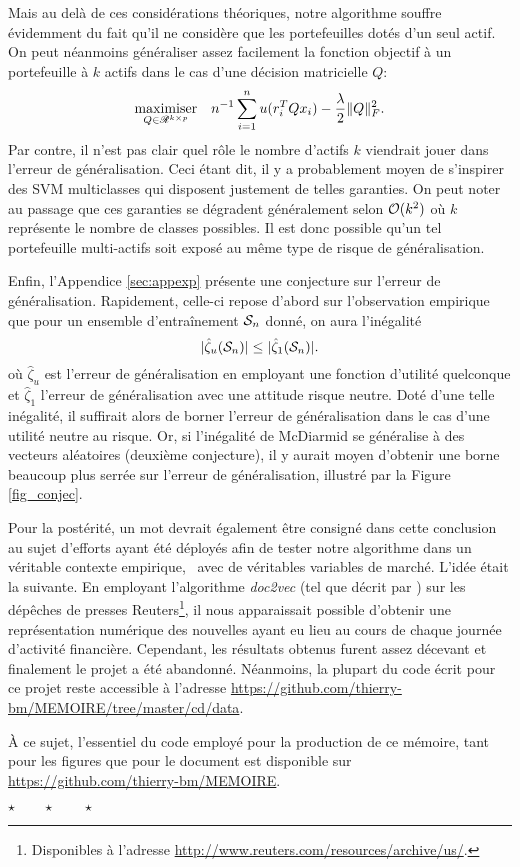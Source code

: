 Mais au delà de ces considérations théoriques, notre algorithme souffre évidemment du fait
qu'il ne considère que les portefeuilles dotés d'un seul actif. On peut néanmoins
généraliser assez facilement la fonction objectif à un portefeuille à $k$ actifs dans le
cas d'une décision matricielle $Q$:
\begin{equation}
  \maximizeEquation[Q \in \Re^{k \times p}]{n^{-1}\sumi u(r_i^TQ x_i) - \frac{\lambda}{2}\|Q\|^2_F.}
\end{equation}
Par contre, il n'est pas clair quel rôle le nombre d'actifs $k$ viendrait jouer dans
l'erreur de généralisation. Ceci étant dit, il y a probablement moyen de s'inspirer des
SVM multiclasses qui disposent justement de telles garanties. On peut noter au passage que
ces garanties se dégradent généralement selon $\bigO(k^2)$ où $k$ représente le nombre de
classes possibles. Il est donc possible qu'un tel portefeuille multi-actifs soit exposé au
même type de risque de généralisation. 

Enfin, l'Appendice \ref{sec:appexp} présente une conjecture sur l'erreur de
généralisation. Rapidement, celle-ci repose d'abord sur l'observation empirique que pour
un ensemble d'entraînement $\S_n$ donné, on aura l'inégalité
\begin{equation}
  |\hat\zeta_u(\S_n)| \leq |\hat\zeta_1(\S_n)|.
\end{equation}
où $\hat\zeta_u$ est l'erreur de généralisation en employant une fonction d'utilité quelconque
et $\hat\zeta_1$ l'erreur de généralisation avec une attitude risque neutre. Doté d'une telle
inégalité, il suffirait alors de borner l'erreur de généralisation dans le cas d'une
utilité neutre au risque. Or, si l'inégalité de McDiarmid se généralise à des vecteurs
aléatoires (deuxième conjecture), il y aurait moyen d'obtenir une borne beaucoup plus
serrée sur l'erreur de généralisation, illustré par la Figure \ref{fig_conjec}.

Pour la postérité, un mot devrait également être consigné dans cette conclusion au sujet
d'efforts ayant été déployés afin de tester notre algorithme dans un véritable contexte
empirique, \ie\ avec de véritables variables de marché. L'idée était la suivante. En
employant l'algorithme \textsl{doc2vec} (tel que décrit par \cite{le2014distributed}) sur
les dépêches de presses Reuters\footnote{Disponibles à l'adresse
  \url{http://www.reuters.com/resources/archive/us/}.}, il nous apparaissait possible
d'obtenir une représentation numérique des nouvelles ayant eu lieu au cours de chaque
journée d'activité financière. Cependant, les résultats obtenus furent assez décevant et
finalement le projet a été abandonné. Néanmoins, la plupart du code écrit pour ce projet
reste accessible à l'adresse
{\small\url{https://github.com/thierry-bm/MEMOIRE/tree/master/cd/data}}.

À ce sujet, l'essentiel du code employé pour la production de ce mémoire, tant pour les
figures que pour le document est disponible sur
{\small\url{https://github.com/thierry-bm/MEMOIRE}}.
\\[1.5cm]
\centerline{$\star \qquad \star \qquad \star$}

